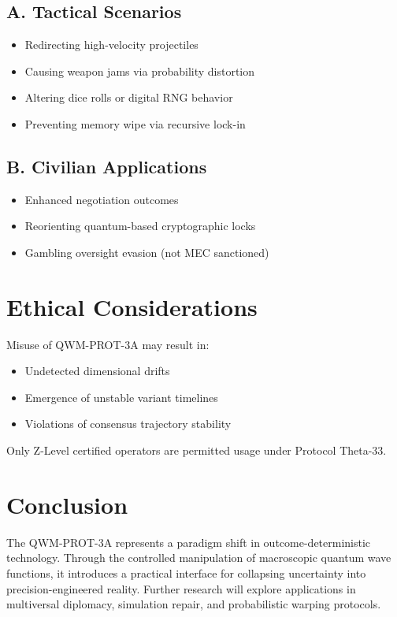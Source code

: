 \documentclass[12pt]{article}
\begin{document}
\subsection*{A. Tactical Scenarios}
\begin{itemize}
    \item Redirecting high-velocity projectiles
    \item Causing weapon jams via probability distortion
    \item Altering dice rolls or digital RNG behavior
    \item Preventing memory wipe via recursive lock-in
\end{itemize}

\subsection*{B. Civilian Applications}
\begin{itemize}
    \item Enhanced negotiation outcomes
    \item Reorienting quantum-based cryptographic locks
    \item Gambling oversight evasion (not MEC sanctioned)
\end{itemize}

\section{Ethical Considerations}
Misuse of QWM-PROT-3A may result in:
\begin{itemize}
    \item Undetected dimensional drifts
    \item Emergence of unstable variant timelines
    \item Violations of consensus trajectory stability
\end{itemize}

Only Z-Level certified operators are permitted usage under Protocol Theta-33.

\section{Conclusion}
The QWM-PROT-3A represents a paradigm shift in outcome-deterministic technology. Through the controlled manipulation of macroscopic quantum wave functions, it introduces a practical interface for collapsing uncertainty into precision-engineered reality. Further research will explore applications in multiversal diplomacy, simulation repair, and probabilistic warping protocols.
\end{document}
